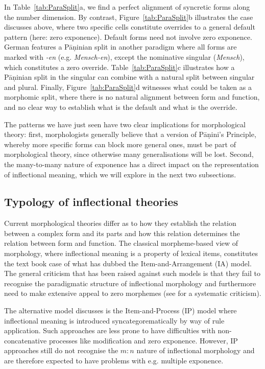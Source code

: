 In Table~\ref{tab:ParaSplit}a, we find a perfect alignment of
syncretic forms along the number dimension. By contrast,
Figure~\ref{tab:ParaSplit}b illustrates the case discusses above,
where two specific cells constitute overrides to a general default
pattern (here: zero exponence). Default forms need not involve zero
exponence. German features a Pāṇinian split in another paradigm where
all forms are marked with \textit{-en} (e.g. \textit{Mensch-en}),
except the nominative singular (\textit{Mensch}), which constitutes a
zero override. Table~\ref{tab:ParaSplit}c illustrates how a Pāṇinian
split in
the singular can combine with a natural split between singular and
plural. Finally, Figure~\ref{tab:ParaSplit}d witnesses what could be
taken as a morphomic split, where there is no natural alignment between
form and function, and no clear way to establish what is the default
and what is the override.

The patterns we have just seen have two clear implications for
morphological theory: first,  morphologists generally believe that
a version of Pāṇini's Principle, whereby more specific forms can block
more general ones, must be part of morphological theory, since
otherwise many generalisations will be lost. 
Second, the many-to-many nature of exponence has a direct impact on
the representation of inflectional meaning, which we will explore in
the next two subsections. 

\subsection{Typology of inflectional theories}
\label{sec:InflTypology}

Current morphological theories differ as to how they establish the
relation between a complex form and its parts and how this relation
determines the relation between form and function. The classical
morpheme-based view of morphology, where inflectional meaning is a
property of lexical items, constitutes the text book case of what
\cite{Hockett54} has dubbed the Item-and-Arrangement (IA) model.  The
general criticism that has been raised against such models is that
they fail to recognise the paradigmatic structure of inflectional
morphology and furthermore need to make extensive appeal to zero
morphemes (see \citealp{Anderson92} for a systematic criticism).

The alternative model \citet{Hockett54} discusses is the
Item-and-Process (IP) model where inflectional meaning is introduced
syncategorematically by way of rule application. Such approaches
are less prone to have difficulties with non-concatenative processes
like modification and zero exponence. However, IP approaches still do
not recognise the $m:n$ nature of inflectional morphology and are
therefore expected to have problems with e.g. multiple exponence. 


